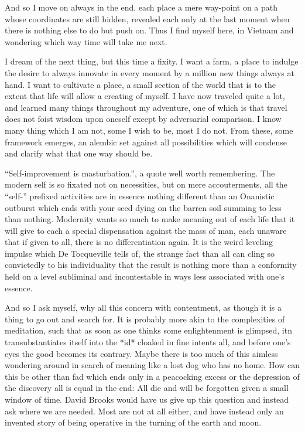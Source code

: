 \documentclass[ebook, 10pt, openright, onecolumn]{memoir}
\newcommand*\td[1]{
  \todo[inline]{
     #1 
  }
}
\newcommand*\finish{\td{ ----- Finish this section -----}}
\begin{document}
And so I move on always in the end, each place a mere way-point on a path whose
coordinates are still hidden, revealed each only at the last moment when there
is nothing else to do but push on.  Thus I find myself here, in Vietnam and
wondering which way time will take me next.

I  dream of the next thing, but this time a fixity.  I want a farm, a place to
indulge the desire to always innovate in every moment by a million new things
always at hand.  I want to cultivate a place, a small section of the world that
is to the extent that life will allow a creating of myself.  I have now traveled
quite a lot, and learned many things throughout my adventure, one of which is
that travel does not foist wisdom upon oneself except by adversarial
comparison.  I know many thing which I am not, some I wish to be, most I do
not.  From these, some framework emerges, an alembic set against all
possibilities which will condense and clarify what that one way should be.

\finish{}

``Self-improvement is masturbation.'', a quote well worth remembering.  The
modern self is so fixated not on necessities, but on mere accouterments, all the
``self-'' prefixed activities are in essence nothing different than an Onanistic
outburst which ends with your seed dying on the barren soil summing to less than
nothing.  Modernity wants so much to make meaning out of each life that it will
give to each a special dispensation against the mass of man, each unaware that
if given to all, there is no differentiation again.  It is the weird leveling
impulse which De Tocqueville tells of, the strange fact than all can cling so
convictedly to his individuality that the result is nothing more than a
conformity held on a level subliminal and incontestable in ways less associated
with one's essence.

And so I ask myself, why all this concern with contentment, as though it is a
thing to go out and search for.  It is probably more akin to the complexities of
meditation, such that as soon as one thinks some enlightenment is glimpsed, itn
transubstantiates itself into the *id* cloaked in fine intents all, and before
one's eyes the good becomes its contrary.  Maybe there is too much of this
aimless wondering around in search of meaning like a lost dog who has no home.
How can this be other than fad which ends only in a peacocking excess or the
depression of the discovery all is equal in the end: All die and will be
forgotten given a small window of time.  David Brooks would have us give up this
question and instead ask where we are needed.  Most are not at all either, and
have instead only an invented story of being operative in the turning of the
earth and moon. 
\end{document}
